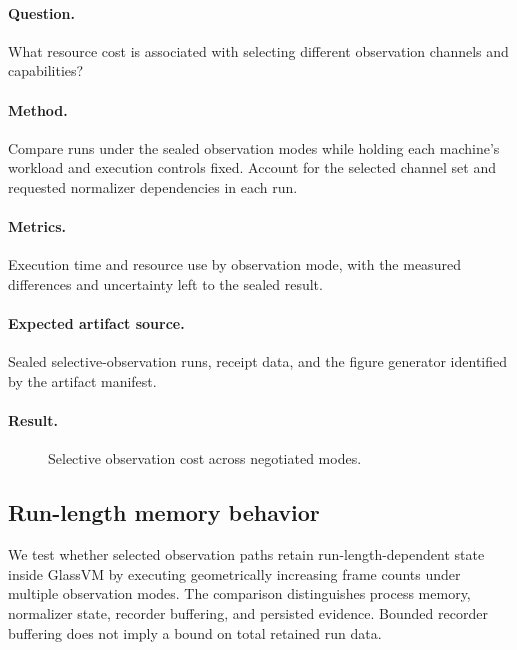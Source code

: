 \paragraph{Question.} What resource cost is associated with selecting
different observation channels and capabilities?

\paragraph{Method.} Compare runs under the sealed observation modes while
holding each machine's workload and execution controls fixed. Account for
the selected channel set and requested normalizer dependencies in each run.

\paragraph{Metrics.} Execution time and resource use by observation mode,
with the measured differences and uncertainty left to the sealed result.

\paragraph{Expected artifact source.} Sealed selective-observation runs,
receipt data, and the figure generator identified by the artifact manifest.

\paragraph{Result.} \TBAObservationResult

\begin{figure}[t]
  \centering
  \PaperPlaceholderFigure{2.4cm}{\TBAObservationFigure}
  \caption{Selective observation cost across negotiated modes.
  \TBAObservationCaption}
  \label{fig:observation-cost}
\end{figure}

\subsection{Run-length memory behavior}
\label{sec:memory}

We test whether selected observation paths retain run-length-dependent state
inside GlassVM by executing geometrically increasing frame counts under
multiple observation modes. The comparison distinguishes process memory,
normalizer state, recorder buffering, and persisted evidence. Bounded
recorder buffering does not imply a bound on total retained run data.

